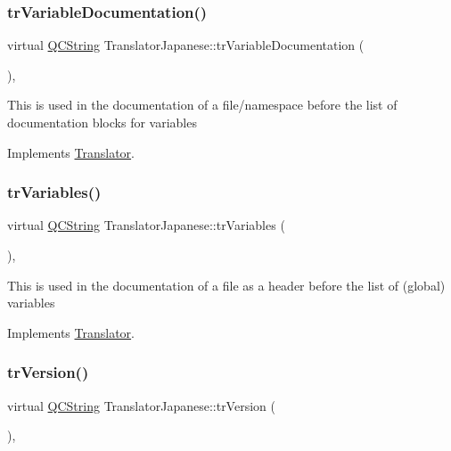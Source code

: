 \subsubsection{\texorpdfstring{trVariableDocumentation()}{trVariableDocumentation()}}
{\footnotesize\ttfamily virtual \mbox{\hyperlink{class_q_c_string}{Q\+C\+String}} Translator\+Japanese\+::tr\+Variable\+Documentation (\begin{DoxyParamCaption}{ }\end{DoxyParamCaption})\hspace{0.3cm}{\ttfamily [inline]}, {\ttfamily [virtual]}}

This is used in the documentation of a file/namespace before the list of documentation blocks for variables 

Implements \mbox{\hyperlink{class_translator}{Translator}}.

\mbox{\label{class_translator_japanese_aed55bdddccf7f8eafc06f3def1d091b3}} 
\subsubsection{\texorpdfstring{trVariables()}{trVariables()}}
{\footnotesize\ttfamily virtual \mbox{\hyperlink{class_q_c_string}{Q\+C\+String}} Translator\+Japanese\+::tr\+Variables (\begin{DoxyParamCaption}{ }\end{DoxyParamCaption})\hspace{0.3cm}{\ttfamily [inline]}, {\ttfamily [virtual]}}

This is used in the documentation of a file as a header before the list of (global) variables 

Implements \mbox{\hyperlink{class_translator}{Translator}}.

\mbox{\label{class_translator_japanese_abc86ceef2d5126c02e809ca52b1b029c}} 
\subsubsection{\texorpdfstring{trVersion()}{trVersion()}}
{\footnotesize\ttfamily virtual \mbox{\hyperlink{class_q_c_string}{Q\+C\+String}} Translator\+Japanese\+::tr\+Version (\begin{DoxyParamCaption}{ }\end{DoxyParamCaption})\hspace{0.3cm}{\ttfamily [inline]}, {\ttfamily [virtual]}}

